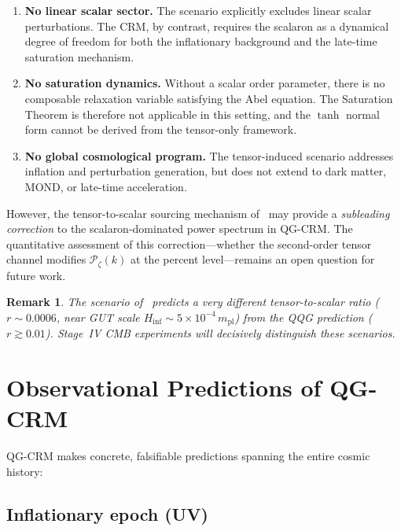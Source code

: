 \documentclass[aps,prd,twocolumn,superscriptaddress,nofootinbib]{revtex4-2}
\newtheorem{remark}{Remark}
\begin{document}
\begin{enumerate}
\item \textbf{No linear scalar sector.} The scenario explicitly excludes linear scalar perturbations. The CRM, by contrast, requires the scalaron as a dynamical degree of freedom for both the inflationary background and the late-time saturation mechanism.

\item \textbf{No saturation dynamics.} Without a scalar order parameter, there is no composable relaxation variable satisfying the Abel equation. The Saturation Theorem is therefore not applicable in this setting, and the $\tanh$ normal form cannot be derived from the tensor-only framework.

\item \textbf{No global cosmological program.} The tensor-induced scenario addresses inflation and perturbation generation, but does not extend to dark matter, MOND, or late-time acceleration.
\end{enumerate}

However, the tensor-to-scalar sourcing mechanism of~\cite{Bertacca2025} may provide a \textit{subleading correction} to the scalaron-dominated power spectrum in QG-CRM. The quantitative assessment of this correction---whether the second-order tensor channel modifies $\mathcal{P}_\zeta(k)$ at the percent level---remains an open question for future work.

\begin{remark}
The scenario of~\cite{Bertacca2025} predicts a very different tensor-to-scalar ratio ($r \sim 0.0006$, near GUT scale $H_\mathrm{inf} \sim 5 \times 10^{-4}\,m_\mathrm{pl}$) from the QQG prediction ($r \gtrsim 0.01$). Stage~IV CMB experiments will decisively distinguish these scenarios.
\end{remark}


\section{Observational Predictions of QG-CRM}
\label{sec:predictions}

QG-CRM makes concrete, falsifiable predictions spanning the entire cosmic history:

\subsection{Inflationary epoch (UV)}
\end{document}
